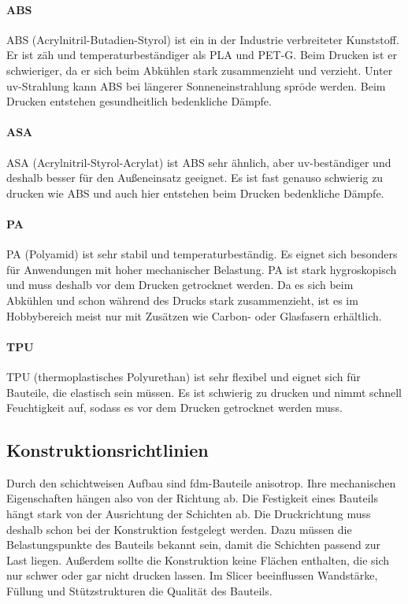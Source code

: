        \paragraph{ABS}
        ABS (Acrylnitril-Butadien-Styrol) ist ein in der Industrie verbreiteter Kunststoff. Er ist zäh und temperaturbeständiger als PLA und PET-G. Beim Drucken ist er schwieriger, da er sich beim Abkühlen stark zusammenzieht und verzieht. Unter \gls{uv}-Strahlung kann ABS bei längerer Sonneneinstrahlung spröde werden. Beim Drucken entstehen gesundheitlich bedenkliche Dämpfe.

        \paragraph{ASA}
        ASA (Acrylnitril-Styrol-Acrylat) ist ABS sehr ähnlich, aber \gls{uv}-beständiger und deshalb besser für den Außeneinsatz geeignet. Es ist fast genauso schwierig zu drucken wie ABS und auch hier entstehen beim Drucken bedenkliche Dämpfe.

        \paragraph{PA}
        PA (Polyamid) ist sehr stabil und temperaturbeständig. Es eignet sich besonders für Anwendungen mit hoher mechanischer Belastung. PA ist stark hygroskopisch und muss deshalb vor dem Drucken getrocknet werden. Da es sich beim Abkühlen und schon während des Drucks stark zusammenzieht, ist es im Hobbybereich meist nur mit Zusätzen wie Carbon- oder Glasfasern erhältlich.

        \paragraph{TPU}
        TPU (thermoplastisches Polyurethan) ist sehr flexibel und eignet sich für Bauteile, die elastisch sein müssen. Es ist schwierig zu drucken und nimmt schnell Feuchtigkeit auf, sodass es vor dem Drucken getrocknet werden muss.

        \subsection{Konstruktionsrichtlinien}
        \label{sec:SdT_Konstruktion}

        Durch den schichtweisen Aufbau sind \gls{fdm}-Bauteile anisotrop. Ihre mechanischen Eigenschaften hängen also von der Richtung ab. Die Festigkeit eines Bauteils hängt stark von der Ausrichtung der Schichten ab. Die Druckrichtung muss deshalb schon bei der Konstruktion festgelegt werden. Dazu müssen die Belastungspunkte des Bauteils bekannt sein, damit die Schichten passend zur Last liegen. Außerdem sollte die Konstruktion keine Flächen enthalten, die sich nur schwer oder gar nicht drucken lassen. Im Slicer beeinflussen Wandstärke, Füllung und Stützstrukturen die Qualität des Bauteils.

